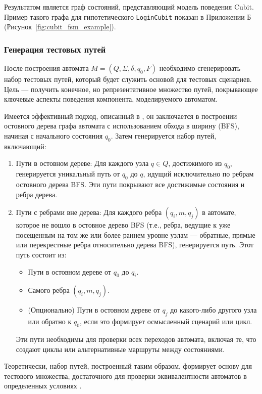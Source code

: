 \documentclass[14pt, russian]{scrartcl}
\begin{document}
Результатом является граф состояний, представляющий модель поведения Cubit. Пример такого графа для гипотетического \texttt{LoginCubit} показан в Приложении Б (Рисунок~\ref{fig:cubit_fsm_example}).

\subsubsection{Генерация тестовых путей}

После построения автомата $M = (Q, \Sigma, \delta, q_0, F)$ необходимо сгенерировать набор тестовых путей, который будет служить основой для тестовых сценариев. Цель — получить конечное, но репрезентативное множество путей, покрывающее ключевые аспекты поведения компонента, моделируемого автоматом.

Имеется эффективный подход, описанный в \cite{Karhumaki1992}, он заключается в построении остовного дерева графа автомата с использованием обхода в ширину (BFS), начиная с начального состояния $q_0$. Затем генерируется набор путей, включающий:

\begin{enumerate}
    \item {Пути в остовном дереве:} Для каждого узла $q \in Q$, достижимого из $q_0$, генерируется уникальный путь от $q_0$ до $q$, идущий исключительно по ребрам остовного дерева BFS. Эти пути покрывают все достижимые состояния и ребра дерева.
    \item {Пути с ребрами вне дерева:} Для каждого ребра $(q_i, m, q_j)$ в автомате, которое не вошло в остовное дерево BFS (т.е., ребра, ведущие к уже посещенным на том же или более раннем уровне узлам — обратные, прямые или перекрестные ребра относительно дерева BFS), генерируется путь. Этот путь состоит из:
        \begin{itemize}
            \item Пути в остовном дереве от $q_0$ до $q_i$.
            \item Самого ребра $(q_i, m, q_j)$.
            \item (Опционально) Пути в остовном дереве от $q_j$ до какого-либо другого узла или обратно к $q_0$, если это формирует осмысленный сценарий или цикл.
        \end{itemize}
        Эти пути необходимы для проверки всех переходов автомата, включая те, что создают циклы или альтернативные маршруты между состояниями.
\end{enumerate}

Теоретически, набор путей, построенный таким образом, формирует основу для тестового множества, достаточного для проверки эквивалентности автоматов в определенных условиях \cite{Karhumaki1992}.
\end{document}
